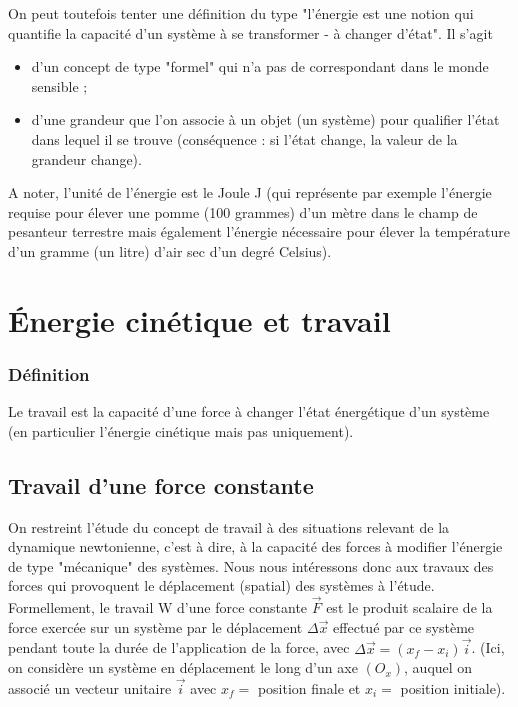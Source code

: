 \documentclass[a4paper,10pt]{book}
\begin{document}
On peut toutefois tenter une définition du type "l’énergie est une notion qui quantifie la capacité d’un système à se transformer - à changer d’état". Il s’agit
\begin{itemize}\renewcommand{\labelitemi}{$\bullet$} \item d’un concept de type "formel" qui n’a pas de correspondant dans le monde sensible ;
\item d’une grandeur que l’on associe à un objet (un système) pour qualifier l’état dans lequel il se trouve (conséquence : si l’état change, la valeur de la grandeur change).\\ \end{itemize}

A noter, l’unité de l’énergie est le Joule J (qui représente par exemple l’énergie requise pour élever une pomme (100 grammes) d’un mètre dans le champ de pesanteur terrestre mais également l’énergie nécessaire pour élever la température d’un gramme (un litre) d’air sec d’un degré Celsius).


\section{Énergie cinétique et travail}
\subsubsection{Définition}
Le travail est la capacité d'une force à changer l'état énergétique d'un système (en particulier l'énergie cinétique mais pas uniquement).
\subsection{Travail d'une force constante}
On restreint l’étude du concept de travail à des situations relevant de la dynamique newtonienne, c’est à dire, à la capacité des forces à modifier l’énergie de type "mécanique" des systèmes. Nous nous intéressons donc aux travaux des forces qui provoquent le déplacement (spatial) des systèmes à l’étude.\\

Formellement, le travail W d’une force constante $\vec{F}$ est le produit scalaire de la force exercée sur un système par le déplacement $\Delta\vec{x}$ effectué par ce système pendant toute la durée de l’application de la force, avec $\Delta\vec{x}= (x_{f}-x_{i})\vec{i}$. (Ici, on considère un système en déplacement le long d’un axe $(O_{x})$, auquel on associé un vecteur unitaire $\vec{i}$ avec $x_{f}=$ position finale et $x_{i}=$ position initiale).
\end{document}
